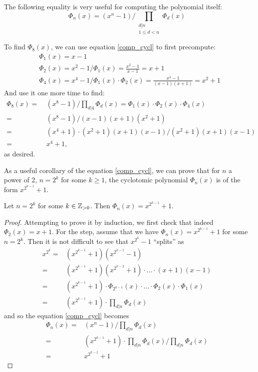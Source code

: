 The following equality is very useful for computing the polynomial itself:
\begin{equation}\label{comp_cycl} 
	\Phi_n(x) = (x^n - 1) \bigg/ \prod_{\substack{d | n\\ 1 \leq d < n}} \Phi_d(x) 
\end{equation}
\begin{example}
	To find $\Phi_8(x)$, we can use equation \ref{comp_cycl} to first precompute:
  \begin{align*}
	  & \Phi_1(x) = x - 1 \\
	  & \Phi_2(x) = x^2-1\Big/\Phi_1(x) = \frac{x^2 - 1}{x-1} = x+1 \\
	  & \Phi_4(x) = x^4-1\Big/\Phi_1(x)\cdot \Phi_2(x) = \frac{x^4-1}{(x-1)(x+1)} = x^2 + 1
  \end{align*}
	  And use it one more time to find:
	  \begin{align*}
		  \Phi_8(x) = \; & (x^8 - 1) \Big/ \prod_{{d | 4}} \Phi_d(x) = \Phi_1(x) \cdot \Phi_2(x) \cdot \Phi_4(x) \\
		  = \; & (x^8 - 1) \Big/(x-1)(x+1)(x^2+1) \\
		  = \; & (x^4+1)\cdot (x^2+1)(x+1)(x-1) \Big/(x^2+1)(x+1)(x-1) \\
		  = \; & x^4 +1,
	  \end{align*}
	  as desired.
\end{example}
As a useful corollary of the equation \ref{comp_cycl}, we can prove that for $n$ a power of 2, $n = 2^k$ for some $k \geq 1$, the cyclotomic polynomial $\Phi_n(x)$ is of the form $x^{2^{k - 1}} + 1$.
\begin{corollary}\label{2k-cycl}
  Let $n= 2^k$ for some $k \in \mathbb{Z}_{> 0}$. Then $\Phi_n(x) = x^{2^{k-1}} + 1$.
\end{corollary}
\begin{proof}
	Attempting to prove it by induction, we first check that indeed $\Phi_2(x) = x+1$. For the step, assume that we have $\Phi_n(x) = x^{2^{k-1}} + 1$ for some $n = 2^k$. Then it is not difficult to see that $x^{2^k} -1$ ``splits'' as 
	\begin{align*}
		x^{2^k} = & (x^{2^{k-1}} + 1)(x^{2^{k-1}} - 1) \\
		= & (x^{2^{k-1}} + 1)(x^{2^{k-2}} + 1) \cdot \ldots \cdot (x+1)(x-1) \\
		= & (x^{2^{k-1}} + 1) \cdot \Phi_{2^{k-1}}(x) \cdot \ldots \cdot \Phi_2(x) \cdot \Phi_1(x) \\
		= & (x^{2^{k-1}} + 1) \cdot \prod_{d | n} \Phi_d(x)
	\end{align*}
	and so the equation \ref{comp_cycl} becomes
	\begin{align*}
		\Phi_n(x) = & (x^n - 1) \Big/ \prod_{d|n} \Phi_d(x) \\
		= & (x^{2^{k-1}} + 1) \cdot \prod_{d|n} \Phi_d(x) \Big/ \prod_{d|n} \Phi_d(x)\\
		= & x^{2^{k-1}} + 1
	\end{align*}
\end{proof}

